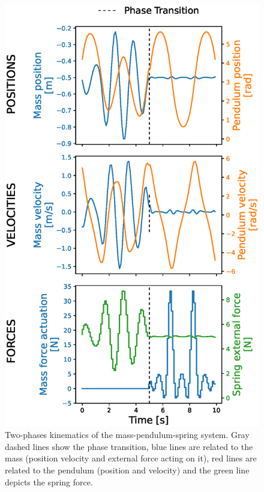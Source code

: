 \begin{figure}[h!]
\centering
\includegraphics[width=\columnwidth]{figures/Mass_Pendulum_Fext.eps}
\caption{Two-phases kinematics of the mass-pendulum-spring system. Gray dashed lines show the phase transition, blue lines are related to the mass (position velocity and external force acting on it), red lines are related to the pendulum (position and velocity) and the green line depicts the spring force.}
\label{fig:Mass_Pendulum_Fext_graphs}
\vspace*{-0.5cm}
\end{figure}
